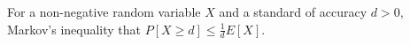 \documentclass[12pt]{article}
\begin{document}
For a non-negative random variable $X$ and a standard of accuracy $d > 0$, Markov's inequality  that $P[X \ge d] \le \frac{1}{d} E[X]$.
\end{document}
